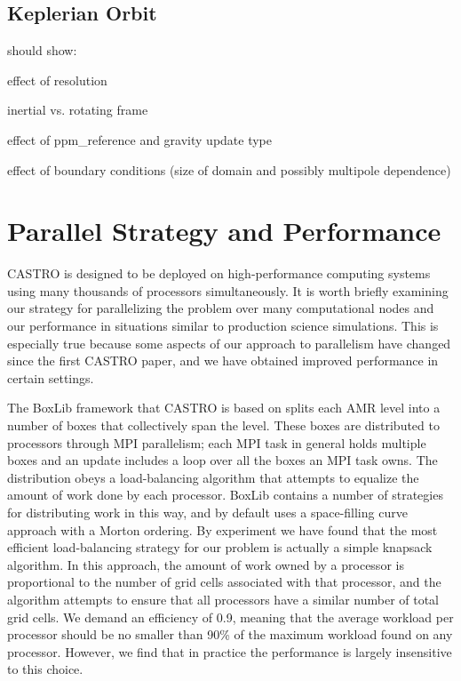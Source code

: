 \documentclass[iop]{emulateapj}
\begin{document}
\subsection{Keplerian Orbit}\label{sec:kepler}

should show:

effect of resolution

inertial vs. rotating frame

effect of ppm\_reference and gravity update type

effect of boundary conditions (size of domain and possibly multipole dependence)


\section{Parallel Strategy and Performance}\label{sec:Performance}

CASTRO is designed to be deployed on high-performance computing systems using 
many thousands of processors simultaneously. It is worth briefly examining 
our strategy for parallelizing the problem over many computational nodes 
and our performance in situations similar to production science simulations. 
This is especially true because some aspects of our approach to parallelism 
have changed since the first CASTRO paper, and we have obtained improved 
performance in certain settings.

The BoxLib framework that CASTRO is based on splits each AMR level into a number 
of boxes that collectively span the level. These boxes are distributed to processors 
through MPI parallelism; each MPI task in general holds multiple boxes and 
an update includes a loop over all the boxes an MPI task owns. The distribution 
obeys a load-balancing algorithm that attempts to equalize the amount of work 
done by each processor. BoxLib contains a number of strategies for distributing 
work in this way, and by default uses a space-filling curve approach with a 
Morton ordering. By experiment we have found that the most efficient load-balancing 
strategy for our problem is actually a simple knapsack algorithm. In this approach, 
the amount of work owned by a processor is proportional to the number of grid cells 
associated with that processor, and the algorithm attempts to ensure that all 
processors have a similar number of total grid cells. We demand an efficiency of 0.9,
meaning that the average workload per processor should be no smaller than 90\% of the 
maximum workload found on any processor. However, we find that in practice the 
performance is largely insensitive to this choice.
\end{document}
